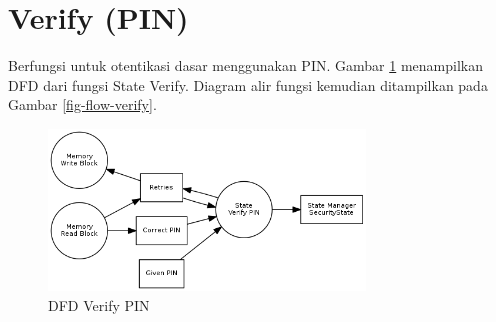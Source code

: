 \section{Verify (PIN)}
\label{sec_verify}

Berfungsi untuk otentikasi dasar menggunakan PIN. Gambar \ref{fig-dfd-verify} menampilkan DFD dari fungsi State Verify. Diagram alir fungsi kemudian ditampilkan pada Gambar \ref{fig-flow-verify}. 

\begin{figure}[h]
\centering
\includegraphics[width=0.75\textwidth]{image/state/dfd_verify.png}
\caption{DFD Verify PIN}
\label{fig-dfd-verify}
\end{figure}

